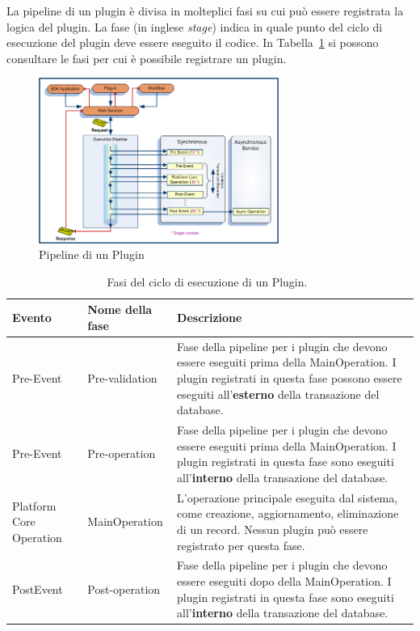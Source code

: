 La pipeline di un plugin è divisa in molteplici fasi su cui può essere registrata la logica del plugin. La fase (in inglese \textit{stage}) indica in quale punto del ciclo di esecuzione del plugin deve essere eseguito il codice. In Tabella~\ref{table:pluginStages} si possono consultare le fasi per cui è possibile registrare un plugin.  

\begin{figure}[ht]
  \centering
  \includegraphics[width=0.7\textwidth]{plugin-pipeline.png}
  \caption{Pipeline di un Plugin}
  \label{fig:pluginPipeline}
\end{figure}

\begin{table}[ht!]
  \centering
  \begin{tabular}{p{}lp{}}
    \toprule
      \textbf{Evento} & \textbf{Nome della fase} & \textbf{Descrizione} \\
    \midrule
      Pre-Event & Pre-validation &  Fase della pipeline per i plugin che devono essere eseguiti prima della MainOperation. I plugin registrati in questa fase possono essere eseguiti all'\textbf{esterno} della transazione del database. \\
    \midrule
      Pre-Event & Pre-operation & Fase della pipeline per i plugin che devono essere eseguiti prima della MainOperation. I plugin registrati in questa fase sono eseguiti all'\textbf{interno} della transazione del database. \\
    \midrule
      Platform Core Operation & MainOperation &  L'operazione principale eseguita dal sistema, come creazione, aggiornamento, eliminazione di un record. Nessun plugin può essere registrato per questa fase. \\
    \midrule
      PostEvent & Post-operation &  Fase della pipeline per i plugin che devono essere eseguiti dopo della MainOperation. I plugin registrati in questa fase sono eseguiti all'\textbf{interno} della transazione del database. \\
    \bottomrule
  \end{tabular}
  \caption{Fasi del ciclo di esecuzione di un Plugin.~\cite{DynamicsTutorialspoint}}
  \label{table:pluginStages}
\end{table}

